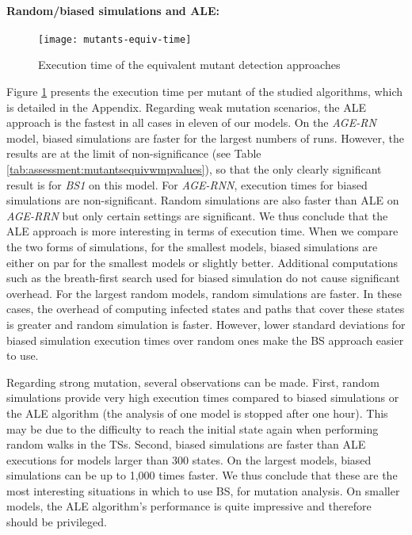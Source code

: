 \paragraph{Random/biased simulations and ALE:}

\begin{figure}[t]
	\centering
	\texttt{[image: mutants-equiv-time]}
	\caption{Execution time of the equivalent mutant detection approaches}
	\label{fig:assessment:mutantsequivtime}
\end{figure}

Figure \ref{fig:assessment:mutantsequivtime} presents the execution time per mutant of the studied algorithms, which is detailed in the Appendix. Regarding weak mutation scenarios, the ALE approach is the fastest in all cases in eleven of our models. On the \textit{AGE-RN} model,  biased simulations are faster for the largest numbers of runs.  However, the results are at the limit of non-significance (see Table \ref{tab:assessment:mutantsequivwmpvalues}), so that the only clearly significant result is for \emph{BS1} on this model. For \textit{AGE-RNN}, execution times for  biased simulations are non-significant. Random simulations are also faster than ALE on \textit{AGE-RRN} but only certain settings are significant. We thus conclude that the ALE approach is more interesting in terms of execution time. When we compare the two forms of simulations, for the smallest models, biased simulations are either on par for the smallest models or slightly better. Additional computations such as the breath-first search used for biased simulation do not cause significant overhead. For the largest random models, random simulations are faster. In these cases, the overhead of computing infected states and paths that cover these states is greater and random simulation is faster.  However, lower standard deviations for biased simulation execution times over random ones make the BS approach easier to use.
       
Regarding strong mutation, several observations can be made. First, random simulations provide very high execution times compared to biased simulations or the ALE algorithm (the analysis of one model is stopped after one hour). This may be due to the difficulty to reach the initial state again when performing random walks in the TSs.
Second, biased simulations are faster than ALE executions for models larger than 300 states. On the largest models, biased simulations can be up to 1,000 times faster. We thus conclude that these are the most interesting situations in which to use BS, for mutation analysis.  On smaller models, the ALE algorithm's performance is quite impressive and therefore should be privileged.              

